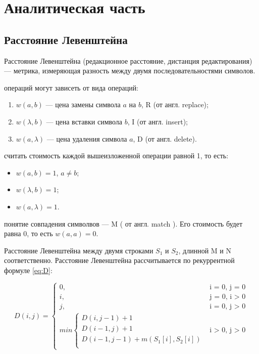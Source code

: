 \documentclass[a4paper,14pt, unknownkeysallowed]{bmstu}
\begin{document}
\chapter{Аналитическая часть}
	\section{Расстояние Левенштейна}

	Расстояние Левенштейна (редакционное расстояние, дистанция редактирования) --- метрика, измеряющая разность между двумя последовательностями символов.

	 операций могут зависеть от вида операций:
	\begin{enumerate}
       \item $w(a, b)$ --- цена замены символа $a$ на $b$, R (от англ. replace);
	    \item $w(\lambda, b)$ --- цена вставки символа $b$, I (от англ. insert);
	    \item $w(a, \lambda)$ --- цена удаления символа $a$, D (от англ. delete).
    \end{enumerate}

	 считать стоимость каждой вышеизложенной операции равной 1, то есть:
	\begin{itemize}
    	\item $w(a, b) = 1$, $a \neq b$;
    	\item $w(\lambda, b) = 1$;
    	\item $w(a, \lambda) = 1$.
    \end{itemize}

	 понятие совпадения символвов --- M ( от англ. match ). Его стоимость будет равна 0, то есть $w(a, a) = 0$.

	Расстояние Левенштейна между двумя строками $S_{1}$ и $S_{2}$, длинной M и N соответственно. Расстояние Левенштейна рассчитывается по рекуррентной формуле \ref{eq:D}:

	\begin{equation}
    	\label{eq:L}
    	D(i, j) =
    	\begin{cases}
    	0, &\text{i = 0, j = 0}\\
    	i, &\text{j = 0, i > 0}\\
    	j, &\text{i = 0, j > 0}\\
    	min \begin{cases}
    		D(i, j - 1) + 1\\
    		D(i - 1, j) + 1\\
    		D(i - 1, j - 1) +  m(S_{1}[i], S_{2}[i]) \\
    	    \end{cases}
    	&\text{i > 0, j > 0}
    	\end{cases}
    \end{equation}
\end{document}

